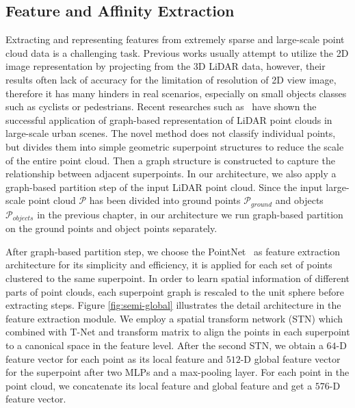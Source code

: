 \documentclass{sip}%
\begin{document}
\subsection{Feature and Affinity Extraction}
Extracting and representing features from extremely sparse and large-scale point cloud data is a challenging task. 
Previous works usually attempt to utilize the 2D image representation by projecting from the 3D LiDAR data, however, their results often lack of accuracy for the limitation of resolution of 2D view image, therefore it has many hinders in real scenarios, especially on small objects classes such as cyclists or pedestrians.
Recent researches such as~\cite{landrieu2018large} have shown the successful application of graph-based representation of LiDAR point clouds in large-scale urban scenes.
The novel method does not classify individual points, but divides them into simple geometric superpoint structures to reduce the scale of the entire point cloud. Then a graph structure is constructed to capture the relationship between adjacent superpoints.
In our architecture, we also apply a graph-based partition step of the input LiDAR point cloud.
%
%
Since the input large-scale point cloud $\mathcal{P}$ has been divided into ground points $\mathcal{P}_{ground}$ and objects $\mathcal{P}_{objects}$ in the previous chapter, in our architecture we run graph-based partition on the ground points and object points separately.



After graph-based partition step, we choose the PointNet~\cite{qi2017pointnet} as feature extraction architecture for its simplicity and efficiency, it is applied for each set of points clustered to the same superpoint. 
In order to learn spatial information of different parts of point clouds, each superpoint graph is rescaled to the unit sphere before extracting steps.
Figure \ref{fig:semi-global} illustrates the detail architecture in the feature extraction module.
We employ a spatial transform network (STN) which combined with T-Net and transform matrix to align the points in each superpoint to a canonical space in the feature level.
After the second STN, we obtain a $64$-D feature vector for each point as its local feature and $512$-D global feature vector for the superpoint after two MLPs and a max-pooling layer.
%
For each point in the point cloud, we concatenate its local feature and global feature and get a $576$-D feature vector.
\end{document}
